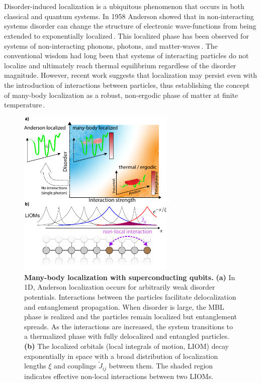 \section{} %
\vspace{-14mm}

Disorder-induced localization is a ubiquitous phenomenon that occurs in both classical and quantum systems. In 1958 Anderson showed that in non-interacting systems disorder can change the structure of electronic wave-functions from being extended to exponentially localized\,\cite{Anderson1958}. This localized phase has been observed for systems of non-interacting phonons, photons, and matter-waves\,\cite{The50years,Billy2008, Weaver1990, Wiersma1997, Schwartz2007}.  The conventional wisdom had long been that systems of interacting particles do not localize and ultimately reach thermal equilibrium regardless of the disorder magnitude. However, recent work suggests that localization may persist even with the introduction of interactions between particles, thus establishing the concept of many-body localization as a robust, non-ergodic phase of matter at finite temperature\,\cite{Basko2006, Gornyi2005, ImbriePRL2016}.

\begin{figure}[h!] %
\centering
\includegraphics[width=75mm]{./PDF/fig_1.pdf}
\vspace{-0.7em}
\caption{ \textbf{Many-body localization with superconducting qubits.} \textbf{(a)} In 1D, Anderson localization occurs for arbitrarily weak disorder potentials. Interactions between the particles facilitate delocalization and entanglement propagation. When disorder is large, the MBL phase is realized and the particles remain localized but entanglement spreads. As the interactions are increased, the system transitions to a thermalized phase with fully delocalized and entangled particles. \textbf{(b)} The localized orbitals (local integrals of motion, LIOM) decay exponentially in space with a broad distribution of localization lengths $\xi$ and couplings $\widetilde{J}_{ij}$ between them. The shaded region indicates effective non-local interactions between two LIOMs.}
\end{figure}

